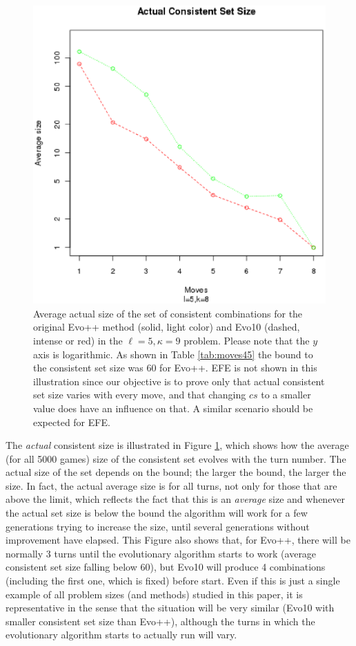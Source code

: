 \documentclass[conference]{IEEEtran}
\begin{document}
%
\begin{figure}[!h]
\centering
\includegraphics[scale=0.50]{cset-size.eps}
\caption{Average actual size of the set of consistent combinations for the original Evo++ method (solid, light
  color) and Evo10 (dashed, intense or red) in the $\ell=5, \kappa=9$ problem.  Please note that the
  $y$ axis is logarithmic. As shown in Table \ref{tab:moves45} the
  bound to the consistent set size was 60 for
  Evo++.  EFE is not shown in this illustration since our objective
  is to prove only that actual consistent set size varies with every
  move, and that changing $cs$ to a smaller value does have an
  influence on that. A similar scenario should be expected for EFE.\label{fig:csize}} 
\end{figure} 
%
The {\em actual} consistent size is
illustrated in Figure \ref{fig:csize}, 
which shows how the average
(for all 5000 games) size of the consistent set evolves with the turn
number. The actual size of the set depends on the bound; the larger
the bound, the larger the size. In fact, the actual average size is for all
turns, not only for those that are above the limit, which reflects
the fact that this is an {\em average} size and whenever the actual
set size is below the bound the algorithm will work for a few
generations trying to increase the size, until several generations
without improvement have elapsed. This Figure also shows that, for
Evo++, there will be normally 3 turns until the evolutionary algorithm
starts to work (average consistent set size falling below 60), but
Evo10 will produce 4 combinations (including the first one, which is
fixed) before start. Even if this is just a single example of all
problem sizes (and methods) studied in this paper, it is representative in the sense
that the situation will be very similar (Evo10 with smaller consistent
set size than Evo++), although the turns in which the evolutionary
algorithm starts to actually run will vary. 
\end{document}
